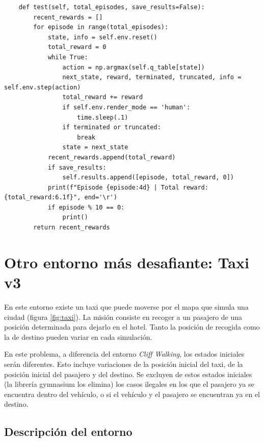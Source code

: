 \documentclass{article}
\begin{document}
\begin{verbatim}
    def test(self, total_episodes, save_results=False):
        recent_rewards = []
        for episode in range(total_episodes):
            state, info = self.env.reset()
            total_reward = 0
            while True:
                action = np.argmax(self.q_table[state])  
                next_state, reward, terminated, truncated, info = self.env.step(action)
                total_reward += reward
                if self.env.render_mode == 'human':
                    time.sleep(.1)
                if terminated or truncated:
                    break
                state = next_state
            recent_rewards.append(total_reward)
            if save_results:
                self.results.append([episode, total_reward, 0])
            print(f"Episode {episode:4d} | Total reward: {total_reward:6.1f}", end='\r')
            if episode % 10 == 0:
                print()
        return recent_rewards
\end{verbatim}






\section{Otro entorno más desafiante: Taxi v3}
En este entorno existe un taxi que puede moverse por el mapa que simula una ciudad (figura \ref{fig:taxi}). La misión consiste en recoger a un pasajero de una posición determinada para dejarlo en el hotel. Tanto la posición de recogida como la de destino pueden variar en cada simulación.

En este problema, a diferencia del entorno \textit{Cliff Walking}, los estados iniciales serán diferentes. Esto incluye variaciones de la posición inicial del taxi, de la posición inicial del pasajero y del destino. Se excluyen de estos estados iniciales (la librería gymnasium los elimina) los casos ilegales en los que el pasajero ya se encuentra dentro del vehículo, o si el vehículo y el pasajero se encuentran ya en el destino.
\subsection{Descripción del entorno}
\end{document}
